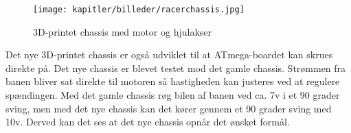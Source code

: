 \begin{figure}[ht]
    \centering
    \texttt{[image: kapitler/billeder/racerchassis.jpg]}
    \caption{3D-printet chassis med motor og hjulakser}
    \label{fig:racerchassis}
\end{figure}

Det nye 3D-printet chassis er også udviklet til at ATmega-boardet kan skrues direkte på. Det nye chassis er blevet testet mod det gamle chassis. Strømmen fra banen bliver sat direkte til motoren så hastigheden kan justeres ved at regulere spændingen. Med det gamle chassis røg bilen af banen ved ca. 7v i et 90 grader sving, men med det nye chassis kan det kører gennem et 90 grader sving med 10v. Derved kan det ses at det nye chassis opnår det ønsket formål. 




